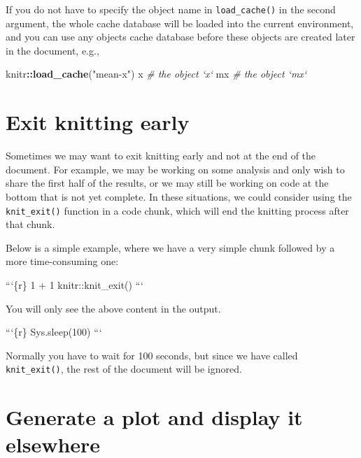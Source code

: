 \documentclass[
  11pt,
]{krantz}
\newenvironment{Shaded}{\begin{snugshade}}{\end{snugshade}}
\newcommand{\BaseNTok}[1]{\textcolor[rgb]{0.06,0.06,0.06}{#1}}
\newcommand{\CommentTok}[1]{\textcolor[rgb]{0.37,0.37,0.37}{\textit{#1}}}
\newcommand{\KeywordTok}[1]{\textcolor[rgb]{0.27,0.27,0.27}{\textbf{#1}}}
\newcommand{\NormalTok}[1]{#1}
\newcommand{\OperatorTok}[1]{\textcolor[rgb]{0.43,0.43,0.43}{\textbf{#1}}}
\newcommand{\StringTok}[1]{\textcolor[rgb]{0.5,0.5,0.5}{#1}}
\begin{document}
If you do not have to specify the object name in \texttt{load\_cache()} in the second argument, the whole cache database will be loaded into the current environment, and you can use any objects cache database before these objects are created later in the document, e.g.,

\begin{Shaded}
\begin{Highlighting}[]
\NormalTok{knitr}\OperatorTok{::}\KeywordTok{load_cache}\NormalTok{(}\StringTok{"mean-x"}\NormalTok{)}
\NormalTok{x  }\CommentTok{# the object `x`}
\NormalTok{mx  }\CommentTok{# the object `mx`}
\end{Highlighting}
\end{Shaded}

\hypertarget{knit-exit}{%
\section{Exit knitting early}\label{knit-exit}}

Sometimes we may want to exit knitting early and not at the end of the document. For example, we may be working on some analysis and only wish to share the first half of the results, or we may still be working on code at the bottom that is not yet complete. In these situations, we could consider using the \texttt{knit\_exit()} function in a code chunk, which will end the knitting process after that chunk.

Below is a simple example, where we have a very simple chunk followed by a more time-consuming one:

\begin{Shaded}
\begin{Highlighting}[]
\BaseNTok{```\{r\}}
\BaseNTok{1 + 1}
\BaseNTok{knitr::knit_exit()}
\BaseNTok{```}

\NormalTok{You will only see the above content in the output.}

\BaseNTok{```\{r\}}
\BaseNTok{Sys.sleep(100)}
\BaseNTok{```}
\end{Highlighting}
\end{Shaded}

Normally you have to wait for 100 seconds, but since we have called \texttt{knit\_exit()}, the rest of the document will be ignored.

\hypertarget{fig-chunk}{%
\section{Generate a plot and display it elsewhere}\label{fig-chunk}}
\end{document}
